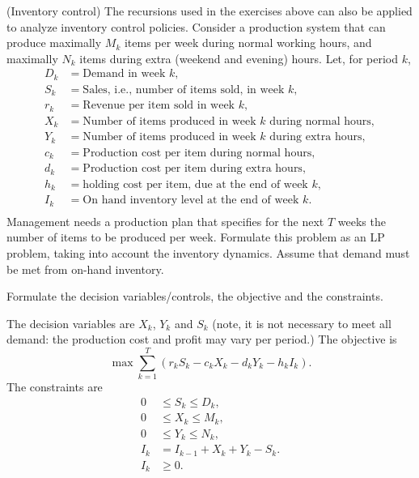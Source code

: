 \begin{exercise}(Inventory control) The recursions used in the
  exercises above can also be applied to analyze inventory control
  policies. Consider a production system that can produce maximally
  $M_k$ items per week during normal working hours, and maximally
  $N_k$ items during extra (weekend and evening) hours. Let, for
  period $k$,
  \begin{align*}
    D_k &= \text{Demand in  week $k$}, \\
    S_k &= \text{Sales, i.e., number of items sold, in week $k$}, \\
    r_k &= \text{Revenue per item sold in week $k$}, \\
    X_k &= \text{Number of items produced in week $k$  during normal hours}, \\
    Y_k &= \text{Number of items produced in week $k$ during extra  hours}, \\
    c_k &= \text{Production cost per item during normal  hours}, \\
    d_k &= \text{Production cost per item during extra  hours}, \\
    h_k &= \text{holding cost per  item, due at the end of week $k$}, \\
    I_k &= \text{On hand inventory level at the end of week $k$}. \\
  \end{align*}
  Management needs a production plan that specifies for the next $T$
  weeks the number of items to be produced per week. Formulate this
  problem as an LP problem, taking into account the inventory
  dynamics.  Assume that demand must be met from on-hand inventory.
  \begin{hint}
Formulate the decision variables/controls, the
    objective and the constraints.    
  \end{hint}
  \begin{solution}
    The decision variables are $X_k$, $Y_k$ and $S_k$ (note, it is not
    necessary to meet all demand:  the production cost and profit
    may vary per period.)  The objective is 
    \begin{equation*}
      \max \sum_{k=1}^T (r_kS_k -c_k X_k - d_k Y_k - h_k I_k).
    \end{equation*}
The constraints are 
\begin{align*}
  0&\leq S_k \leq D_k, \\
  0&\leq X_k \leq M_k, \\
  0&\leq Y_k \leq N_k, \\
  I_k&=I_{k-1}+X_k+Y_k - S_k. \\
I_k &\geq 0.
\end{align*}
  \end{solution}
\end{exercise}

